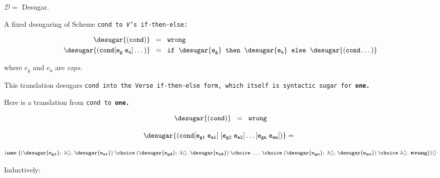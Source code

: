 \documentclass[]{article}
\begin{document}
$\mathcal{D} =$ Desugar.

\bigskip

A fixed desugaring of Scheme \tt{cond} to \textit{V}'s \texttt{if-then-else}: 

\begin{align*}
  \desugar{\tt{(cond)}} \;\; & = \;\; \tt{wrong} \\
\desugar{\tt{(cond [} e_g \; e_a \tt{] \dots)}} \;\; 
& = \;\; \tt{if} \;\; \desugar{e_g}  \;\; \tt{then} \;\; \desugar{e_a} \;\; 
  \tt{else} \;\; \desugar{\tt{(cond \dots)}} \\
\end{align*}

where $e_g$ and $e_a$ are \it{exp}s.

\bigskip


This translation desugars \tt{cond} into the Verse \tt{if-then-else} form, 
which itself is syntactic sugar for \bf{one}. 

\medskip

Here is a translation from \tt{cond} to \bf{one}. 

$$ \desugar{\tt{(cond)}} \;\;  = \;\; \tt{wrong} $$

$$ \desugar{\tt{(cond [} e_{g1} \; e_{a1}\tt{]} \; \tt{[}e_{g2} \; e_{a2} 
   \tt{] \dots [}e_{gn} \; e_{an}\tt{] )}}
  = \;\; 
$$


$$
(\bf{one} \; \{(\desugar{e_{g1}} ; \; \lambda\langle\rangle.\; \desugar{e_{a1}}) \; \choice \; 
(\desugar{e_{g2}} ; \;\lambda\langle\rangle.\; \desugar{e_{a2}}) \; \choice \; \dots \; \choice \; (\desugar{e_{gn}} ; \;\lambda\langle\rangle.\; \desugar{e_{an}}) \; 
\choice \; \lambda\langle\rangle.\;\bf{wrong} \})\langle\rangle  \\
$$  


Inductively: 
\end{document}
